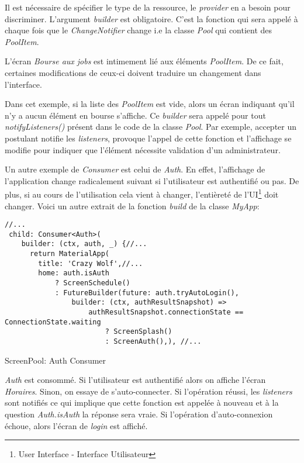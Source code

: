 Il est nécessaire de spécifier le type de la ressource, le \textit{provider} en a besoin pour discriminer. L'argument \textit{builder} est obligatoire. C'est la fonction qui sera appelé à chaque fois que le \textit{ChangeNotifier} change i.e la classe \textit{Pool} qui contient des \textit{PoolItem}. 

L'écran \textit{Bourse aux jobs} est intimement lié aux éléments \textit{PoolItem}. De ce fait, certaines modifications de ceux-ci doivent traduire un changement dans l'interface. 

Dans cet exemple, si la liste des \textit{PoolItem} est vide, alors un écran indiquant qu'il n'y a aucun élément en bourse s'affiche. Ce \textit{builder} sera appelé pour tout \textit{notifyListeners()} présent dans le code de la classe \textit{Pool}. Par exemple, accepter un postulant notifie les \textit{listeners}, provoque l'appel de cette fonction et l'affichage se modifie pour indiquer que l'élément nécessite validation d'un administrateur.

Un autre exemple de \textit{Consumer} est celui de \textit{Auth}. En effet, l'affichage de l'application change radicalement suivant si l'utilisateur est authentifié ou pas. De plus, si au cours de l'utilisation cela vient à changer, l'entièreté de l'UI\footnote{User Interface - Interface Utilisateur} doit changer. Voici un autre extrait de la fonction \textit{build} de la classe \textit{MyApp}:

\begin{listing}[!h]
\begin{verbatim}
//...
 child: Consumer<Auth>(
    builder: (ctx, auth, _) {//...
      return MaterialApp(
        title: 'Crazy Wolf',//...
        home: auth.isAuth
            ? ScreenSchedule()
            : FutureBuilder(future: auth.tryAutoLogin(),
                builder: (ctx, authResultSnapshot) =>
                    authResultSnapshot.connectionState == ConnectionState.waiting
                        ? ScreenSplash()
                        : ScreenAuth(),), //...
\end{verbatim}
\caption{ScreenPool: Auth Consumer}
\label{code:authConsumer}
\end{listing}

\textit{Auth} est consommé. Si l'utilisateur est authentifié alors on affiche l'écran \textit{Horaires}. Sinon, on essaye de s'auto-connecter. Si l'opération réussi, les \textit{listeners} sont notifiés ce qui implique que cette fonction est appelée à nouveau et à la question \textit{Auth.isAuth} la réponse sera vraie. Si l'opération d'auto-connexion échoue, alors l'écran de \textit{login} est affiché.

